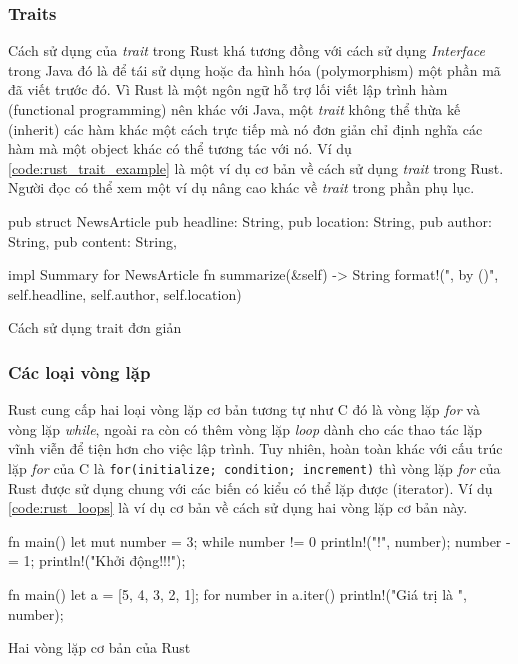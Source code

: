 \subsubsection{Traits}
Cách sử dụng của \emph{trait} trong Rust khá tương đồng với cách sử dụng \emph{Interface} trong Java đó là để tái sử dụng hoặc đa hình hóa (polymorphism) một phần mã đã viết trước đó.
Vì Rust là một ngôn ngữ hỗ trợ lối viết lập trình hàm (functional programming) nên khác với Java, một \emph{trait} không thể thừa kế (inherit) các hàm khác một cách trực tiếp mà nó đơn giản chỉ định nghĩa các hàm mà một object khác có thể tương tác với nó.
Ví dụ \ref{code:rust_trait_example} là một ví dụ cơ bản về cách sử dụng \emph{trait} trong Rust.
Người đọc có thể xem một ví dụ nâng cao khác về \emph{trait} trong phần phụ lục.%
\begin{listing}[ht]
\begin{rustcode}
pub struct NewsArticle {
    pub headline: String,
    pub location: String,
    pub author: String,
    pub content: String,
}

impl Summary for NewsArticle {
    fn summarize(&self) -> String {
        format!("{}, by {} ({})", self.headline, self.author, self.location)
    }
}
\end{rustcode}
\caption{Cách sử dụng trait đơn giản}
\label{code:rust_trait_example}
\end{listing}

\subsubsection{Các loại vòng lặp}
Rust cung cấp hai loại vòng lặp cơ bản tương tự như C đó là vòng lặp \emph{for} và vòng lặp \emph{while}, ngoài ra còn có thêm vòng lặp \emph{loop} dành cho các thao tác lặp vĩnh viễn để tiện hơn cho việc lập trình.
Tuy nhiên, hoàn toàn khác với cấu trúc lặp \emph{for} của C là \texttt{for(initialize; condition; increment)} thì vòng lặp \emph{for} của Rust được sử dụng chung với các biến có kiểu có thể lặp được (iterator).
Ví dụ \ref{code:rust_loops} là ví dụ cơ bản về cách sử dụng hai vòng lặp cơ bản này.

\begin{center}
\begin{listing}
\begin{minipage}[ht]{0.4\linewidth}
\begin{rustcode}
fn main() {
    let mut number = 3;
    while number != 0 {
        println!("{}!", number);
        number -= 1;
    }
    println!("Khởi động!!!");
}
\end{rustcode}
\end{minipage}
\qquad
\begin{minipage}[ht]{0.5\linewidth}
\begin{rustcode}
fn main() {
    let a = [5, 4, 3, 2, 1];
    for number in a.iter() {
        println!("Giá trị là {}", number);
    }
}
\end{rustcode}
\end{minipage}
\caption{Hai vòng lặp cơ bản của Rust}
\label{code:rust_loops}
\end{listing}
\end{center}

